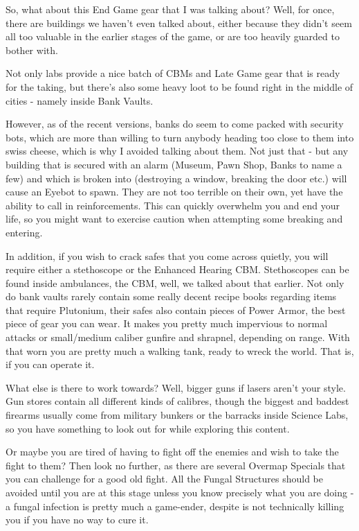 \documentclass[11pt]{report}
\begin{document}
So, what about this End Game gear that I was talking about? Well, for once, there are buildings we haven't even talked about, either because they didn't seem all too valuable in the earlier stages of the game, or are too heavily guarded to bother with.

Not only labs provide a nice batch of CBMs and Late Game gear that is ready for the taking, but there's also some heavy loot to be found right in the middle of cities - namely inside Bank Vaults.

However, as of the recent versions, banks do seem to come packed with security bots, which are more than willing to turn anybody heading too close to them into swiss cheese, which is why I avoided talking about them. Not just that - but any building that is secured with an alarm (Museum, Pawn Shop, Banks to name a few) and which is broken into (destroying a window, breaking the door etc.) will cause an Eyebot to spawn. They are not too terrible on their own, yet have the ability to call in reinforcements. This can quickly overwhelm you and end your life, so you might want to exercise caution when attempting some breaking and entering.

In addition, if you wish to crack safes that you come across quietly, you will require either a stethoscope or the Enhanced Hearing CBM. Stethoscopes can be found inside ambulances, the CBM, well, we talked about that earlier. Not only do bank vaults rarely contain some really decent recipe books regarding items that require Plutonium, their safes also contain pieces of Power Armor, the best piece of gear you can wear. It makes you pretty much impervious to normal attacks or small/medium caliber gunfire and shrapnel, depending on range. With that worn you are pretty much a walking tank, ready to wreck the world. That is, if you can operate it.

What else is there to work towards? Well, bigger guns if lasers aren't your style. Gun stores contain all different kinds of calibres, though the biggest and baddest firearms usually come from military bunkers or the barracks inside Science Labs, so you have something to look out for while exploring this content.

Or maybe you are tired of having to fight off the enemies and wish to take the fight to them? Then look no further, as there are several Overmap Specials that you can challenge for a good old fight. All the Fungal Structures should be avoided until you are at this stage unless you know precisely what you are doing - a fungal infection is pretty much a game-ender, despite is not technically killing you if you have no way to cure it.
\end{document}
